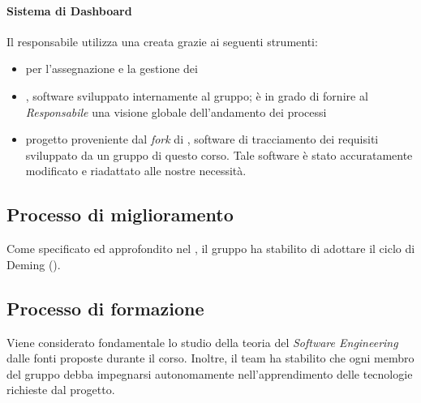 \paragraph*{Sistema di Dashboard}Il responsabile utilizza una  creata grazie ai seguenti strumenti:
\begin{itemize}

\item {} per l'assegnazione e la gestione dei 
\item {}, software sviluppato internamente al gruppo; è in grado di fornire al \textit{Responsabile} una visione globale dell'andamento dei processi
\item {} progetto proveniente dal \textit{fork} di , software di tracciamento dei requisiti sviluppato da un gruppo di questo corso. Tale software è stato accuratamente modificato e riadattato alle nostre necessità.
\end{itemize}

\subsection{Processo di miglioramento}

Come specificato ed approfondito nel \PianoDiQualifica, il gruppo ha stabilito di adottare il ciclo di Deming ().

\subsection{Processo di formazione}

Viene considerato fondamentale lo studio della teoria del \textit{Software Engineering} dalle fonti proposte durante il corso.
Inoltre, il team ha stabilito che ogni membro del gruppo debba impegnarsi autonomamente nell'apprendimento delle tecnologie richieste dal progetto.

